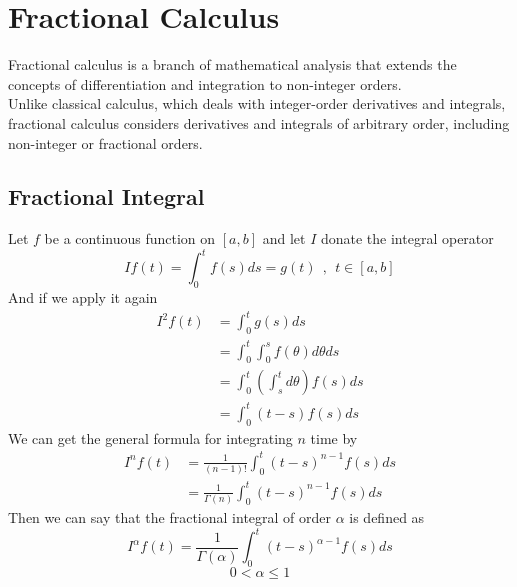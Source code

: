 \section{Fractional Calculus}
Fractional calculus is a branch of mathematical analysis that extends the concepts of 
differentiation and integration to non-integer orders. 
\\
Unlike classical calculus, 
which deals with integer-order derivatives and integrals, fractional calculus considers 
derivatives and integrals of arbitrary order, including non-integer or fractional orders.
\subsection{Fractional Integral}
Let $f$ be a continuous function on $[a,b]$ and let $I$ donate the integral operator
\[
    If(t) = \int_{0}^{t}f(s)ds = g(t) \ \ , \ \ t\in[a,b]
\]
And if we apply it again
\begin{align*}
    I^{2}f(t) & = \int_{0}^{t}g(s)ds                                  \\
              & = \int_{0}^{t}\int_{0}^{s}f(\theta)d\theta ds          \\
              & = \int_{0}^{t} \left(\int_{s}^{t}d\theta\right)f(s)ds \\
              & = \int_{0}^{t} (t-s) f(s) ds
\end{align*}
We can get the general formula for integrating $n$ time by
\begin{align*}
    I^{n}f(t) & = \frac{1}{(n-1)!}\int_{0}^{t}(t-s)^{n-1}f(s)ds   \\
              & =\frac{1}{\Gamma(n)}\int_{0}^{t}(t-s)^{n-1}f(s)ds
\end{align*}
Then we can say that the fractional integral of order $\alpha$ is defined as
\begin{equation}
    I^{\alpha}f(t) =\frac{1}{\Gamma(\alpha)}\int_{0}^{t}(t-s)^{\alpha-1}f(s)ds
\end{equation}
\[
    0<\alpha\leq 1
\]
